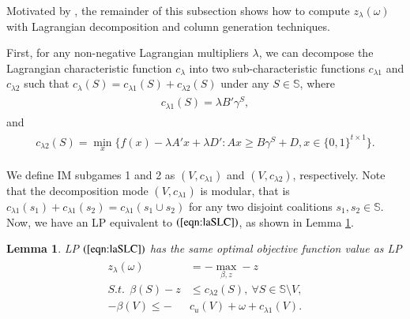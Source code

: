 \documentclass[authoryear,review,12pt]{elsarticle}
\newtheorem{lemma}{Lemma}
\begin{document}
Motivated by \cite{LRCA2016}, the remainder of this subsection shows how to compute $z_{\lambda}(\omega)$ with Lagrangian decomposition and column generation techniques.


First, for any non-negative Lagrangian multipliers $\lambda$, we can decompose the Lagrangian characteristic function $c_{\lambda}$ into two sub-characteristic functions $c_{\lambda1}$ and $c_{\lambda2}$ such that $c_{\lambda}(S) = c_{\lambda1}(S) + c_{\lambda2}(S)$ under any $S \in \mathbb{S}$, where
\begin{eqnarray*}\label{eqn:subcf1}
\begin{aligned}
c_{\lambda1}(S) = \lambda  B'\gamma^S,
\end{aligned}
\end{eqnarray*}
 and
 \begin{eqnarray*}\label{eqn:subcf2}
\begin{aligned}
c_{\lambda2}(S) = \min_x \bigg\{ f(x)-\lambda A'x  + \lambda D':Ax \geq B\gamma^S + D, x \in \{0,1\}^{t \times 1} \bigg\}.
\end{aligned}
\end{eqnarray*}

We define IM subgames 1 and 2 as $(V,c_{\lambda1})$ and $(V,c_{\lambda2})$, respectively. Note that the decomposition mode $(V,c_{\lambda1})$ is modular, that is $c_{\lambda1}(s_1)+c_{\lambda1}(s_2) = c_{\lambda1}(s_1 \cup s_2)$ for any two disjoint coalitions $s_1, s_2 \in \mathbb{S}$. Now, we have an LP equivalent to $(\ref{eqn:laSLC})$, as shown in Lemma \ref{lemma:equivalentLP}.


\begin{lemma}\label{lemma:equivalentLP}
LP $(\ref{eqn:laSLC})$ has the same optimal objective function value as LP
\begin{eqnarray}\label{eqn:l2aSLC}
\begin{aligned}
z_{\lambda}(\omega) &= -\max_{\beta,z} -z\\
S.t. ~~ \beta(S) - z &\leq  c_{\lambda2}(S),~ \forall S \in \mathbb{S} \setminus V,\\
 -\beta(V) \leq  -&c_u(V) + \omega  + c_{\lambda1}(V).
\end{aligned}
\end{eqnarray}
\end{lemma}
\end{document}
